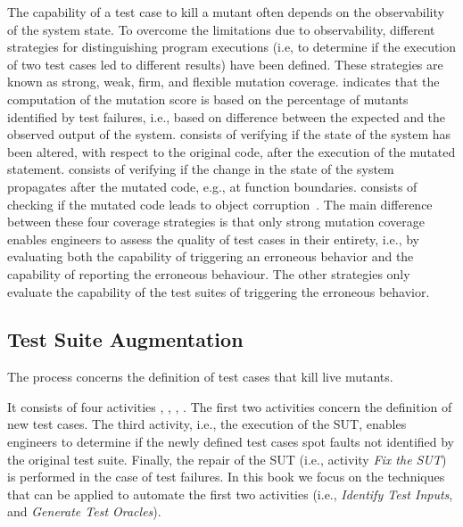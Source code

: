 The capability of a test case to kill a mutant often depends on the observability of the system state. 
To overcome the limitations due to observability, different strategies for distinguishing program executions (i.e, to determine if the execution of two test cases led to different results) have been defined. These strategies are known as strong, weak, firm, and flexible mutation coverage.
 indicates that the computation of the mutation score is based on the percentage of mutants identified by test failures, i.e., based on difference between the expected and the observed output of the system.  
 consists of verifying if the state of the system has been altered, with respect to the original code, after the execution of the mutated statement. 
 consists of verifying if the change in the state of the system propagates after the mutated code, e.g., at function boundaries. 
 consists of checking if the mutated code leads to object corruption~\cite{mateo2012validating}. The main difference between these four coverage strategies is that only strong mutation coverage enables engineers to assess the quality of test cases in their entirety, i.e., by evaluating both the capability of triggering an erroneous behavior and the capability of reporting the erroneous behaviour. 
The other strategies only evaluate the capability of the test suites of triggering the erroneous behavior. 


\subsection{Test Suite Augmentation} %
\label{sub:test_suite_augmentation}

The  process concerns the definition of test cases that kill live mutants.


It consists of four activities , , , . The first two activities concern the definition of new test cases.
The third activity, i.e., the execution of the SUT, enables engineers to determine if the newly defined test cases spot faults not identified by the original test suite. 
Finally, the repair of the SUT (i.e., activity \emph{Fix the SUT}) is performed in the case of test failures.
In this book we focus on the techniques that can be applied to automate the first two activities (i.e., \emph{Identify Test Inputs}, and \emph{Generate Test Oracles}).
 
